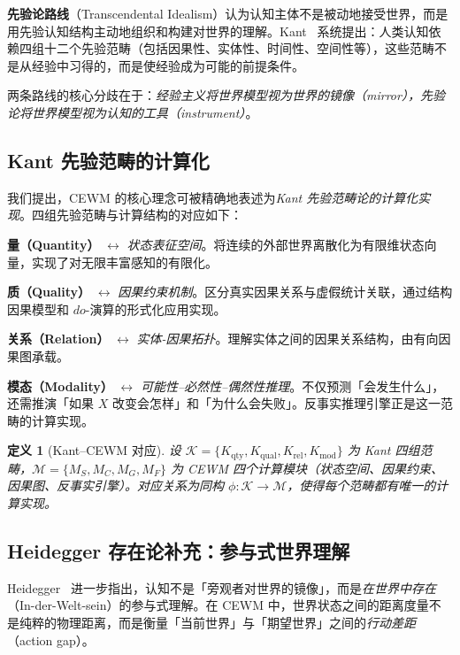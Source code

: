 \documentclass[11pt,a4paper]{article}
\newtheorem{definition}{定义}[section]
\newcommand{\CEWM}{\textsc{CEWM}}
\begin{document}
\textbf{先验论路线}（Transcendental Idealism）认为认知主体不是被动地接受世界，而是用先验认知结构主动地组织和构建对世界的理解。Kant~\citeyearpar{kant1781critique} 系统提出：人类认知依赖四组十二个先验范畴（包括因果性、实体性、时间性、空间性等），这些范畴不是从经验中习得的，而是使经验成为可能的前提条件。

两条路线的核心分歧在于：\emph{经验主义将世界模型视为世界的镜像（mirror），先验论将世界模型视为认知的工具（instrument）}。

\subsection{Kant 先验范畴的计算化}\label{sec:kant}

我们提出，\CEWM{} 的核心理念可被精确地表述为\emph{Kant 先验范畴论的计算化实现}。四组先验范畴与计算结构的对应如下：

\textbf{量（Quantity）} $\leftrightarrow$ \emph{状态表征空间}。将连续的外部世界离散化为有限维状态向量，实现了对无限丰富感知的有限化。

\textbf{质（Quality）} $\leftrightarrow$ \emph{因果约束机制}。区分真实因果关系与虚假统计关联，通过结构因果模型和 $do$-演算的形式化应用实现。

\textbf{关系（Relation）} $\leftrightarrow$ \emph{实体-因果拓扑}。理解实体之间的因果关系结构，由有向因果图承载。

\textbf{模态（Modality）} $\leftrightarrow$ \emph{可能性--必然性--偶然性推理}。不仅预测「会发生什么」，还需推演「如果 $X$ 改变会怎样」和「为什么会失败」。反事实推理引擎正是这一范畴的计算实现。

\begin{definition}[Kant--\CEWM{} 对应]\label{def:kant}
设 $\mathcal{K} = \{K_{\mathrm{qty}}, K_{\mathrm{qual}}, K_{\mathrm{rel}}, K_{\mathrm{mod}}\}$ 为 Kant 四组范畴，$\mathcal{M} = \{M_S, M_C, M_G, M_F\}$ 为 \CEWM{} 四个计算模块（状态空间、因果约束、因果图、反事实引擎）。对应关系为同构 $\phi: \mathcal{K} \to \mathcal{M}$，使得每个范畴都有唯一的计算实现。
\end{definition}

\subsection{Heidegger 存在论补充：参与式世界理解}

Heidegger~\citeyearpar{heidegger1927sein} 进一步指出，认知不是「旁观者对世界的镜像」，而是\emph{在世界中存在}（In-der-Welt-sein）的参与式理解。在 \CEWM{} 中，世界状态之间的距离度量不是纯粹的物理距离，而是衡量「当前世界」与「期望世界」之间的\emph{行动差距}（action gap）。
\end{document}
